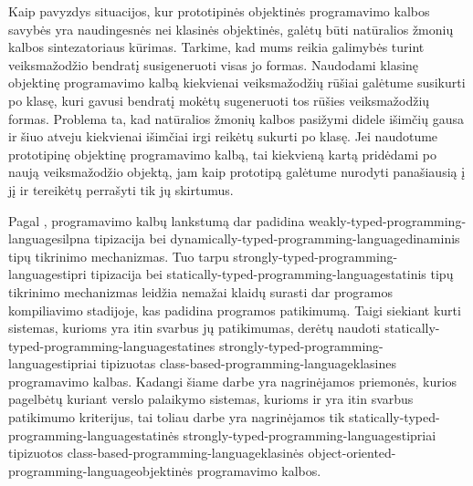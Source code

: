 Kaip pavyzdys situacijos, kur prototipinės objektinės programavimo
kalbos savybės yra naudingesnės nei klasinės objektinės, galėtų
būti natūralios žmonių kalbos sintezatoriaus kūrimas. Tarkime, kad
mums reikia galimybės turint veiksmažodžio bendratį susigeneruoti
visas jo formas. Naudodami klasinę objektinę programavimo kalbą
kiekvienai veiksmažodžių rūšiai galėtume susikurti po klasę,
kuri gavusi bendratį mokėtų sugeneruoti tos rūšies veiksmažodžių
formas. Problema ta, kad natūralios žmonių kalbos pasižymi didele
išimčių gausa ir šiuo atveju kiekvienai išimčiai irgi reikėtų
sukurti po klasę. Jei naudotume prototipinę objektinę programavimo
kalbą, tai kiekvieną kartą pridėdami po naują veiksmažodžio
objektą, jam kaip prototipą galėtume nurodyti panašiausią į jį ir
tereikėtų perrašyti tik jų skirtumus.

Pagal \cite[2]{Madsen:1990:STO:97946.97964}, programavimo kalbų
lankstumą dar padidina \gls{weakly-typed-programming-language}{silpna
tipizacija} bei \gls{dynamically-typed-programming-language}{dinaminis
tipų tikrinimo mechanizmas}. Tuo tarpu
\gls{strongly-typed-programming-language}{stipri tipizacija} bei
\gls{statically-typed-programming-language}{statinis tipų tikrinimo
mechanizmas} leidžia nemažai klaidų surasti dar programos kompiliavimo
stadijoje, kas padidina programos patikimumą. Taigi siekiant kurti
sistemas, kurioms yra itin svarbus jų patikimumas, derėtų naudoti
\gls{statically-typed-programming-language}{statines}
\gls{strongly-typed-programming-language}{stipriai tipizuotas}
\gls{class-based-programming-language}{klasines} programavimo kalbas.
Kadangi šiame darbe yra nagrinėjamos priemonės, kurios pagelbėtų
kuriant verslo palaikymo sistemas, kurioms ir yra itin svarbus
patikimumo kriterijus, tai toliau darbe yra nagrinėjamos tik
\gls{statically-typed-programming-language}{statinės}
\gls{strongly-typed-programming-language}{stipriai tipizuotos}
\gls{class-based-programming-language}{klasinės}
\gls{object-oriented-programming-language}{objektinės} programavimo
kalbos.

